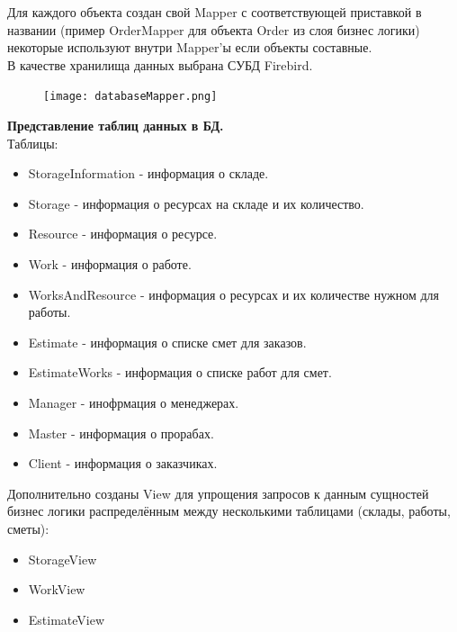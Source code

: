 \documentclass[12pt,a4paper,titlepage]{article}
\begin{document}
Для каждого объекта создан свой Mapper с соответствующей приставкой в названии (пример OrderMapper для объекта Order из слоя бизнес логики) некоторые используют внутри Mapper'ы если объекты составные.
\\
В качестве хранилища данных выбрана СУБД Firebird.
\begin{figure}[!ht]
\texttt{[image: databaseMapper.png]}\caption{}
\end{figure}
\newpage
\textbf{Представление таблиц данных в БД.}
\\ 

Таблицы:
\begin{itemize}
\item StorageInformation - информация о складе.
\item Storage - информация о ресурсах на складе и их количество.
\item Resource - информация о ресурсе. 
\item Work - информация о работе.
\item WorksAndResource - информация о ресурсах и их количестве нужном для работы.
\item Estimate - информация о списке смет для заказов.
\item EstimateWorks - информация о списке работ для смет.
\item Manager - инофрмация о менеджерах.
\item Master - информация о прорабах.
\item Client - информация о заказчиках.
\end{itemize}
Дополнительно созданы View для упрощения запросов к данным сущностей бизнес логики распределённым между несколькими таблицами (склады, работы, сметы):
\begin{itemize}
\item StorageView
\item WorkView
\item EstimateView
\end{itemize}
\newpage
\end{document}
